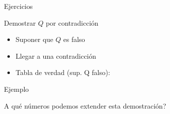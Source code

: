 \documentclass[14pt,aspectratio=169,xcolor=dvipsnames]{beamer}
\begin{document}
\begin{frame}{Ejercicios}
    \begin{center}

    \end{center}
\end{frame}
\begin{frame}{Demostrar $Q$ por contradicción}
    \begin{itemize}
        \item<1-> Suponer que $Q$ es falso
        \item<2-> Llegar a una contradicción
        \item<3-> Tabla de verdad (\alert{sup. Q falso}):
    \end{itemize}
\end{frame}
\begin{frame}{Ejemplo}

    \begin{center}
    \end{center}

    \pause A qué números podemos extender esta demostración? 
\end{frame}
\end{document}
